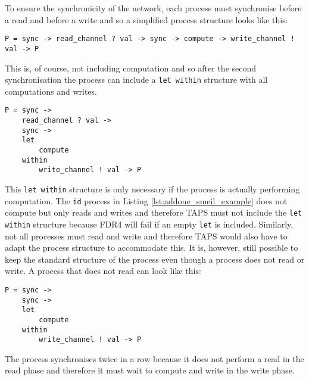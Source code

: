 To ensure the synchronicity of the network, each process must synchronise before a read and before a write and so a simplified process structure looks like this:
\begin{verbatim}
P = sync -> read_channel ? val -> sync -> compute -> write_channel ! val -> P
\end{verbatim}
This is, of course, not including computation and so after the second synchronisation the process can include a \texttt{let within} structure with all computations and writes.
\begin{verbatim}
P = sync ->
    read_channel ? val ->
    sync ->
    let
        compute
    within
        write_channel ! val -> P
\end{verbatim}
This \texttt{let within} structure is only necessary if the process is actually performing computation. The \texttt{id} process in Listing \ref{lst:addone_smeil_example} does not compute but only reads and writes and therefore TAPS must not include the \texttt{let within} structure because FDR4 will fail if an empty \texttt{let} is included. Similarly, not all processes must read and write and therefore TAPS would also have to adapt the process structure to accommodate this. It is, however, still possible to keep the standard structure of the process even though a process does not read or write. A process that does not read can look like this:
\begin{verbatim}
P = sync ->
    sync ->
    let
        compute
    within
        write_channel ! val -> P
\end{verbatim}
The process synchronises twice in a row because it does not perform a read in the read phase and therefore it must wait to compute and write in the write phase. \\

